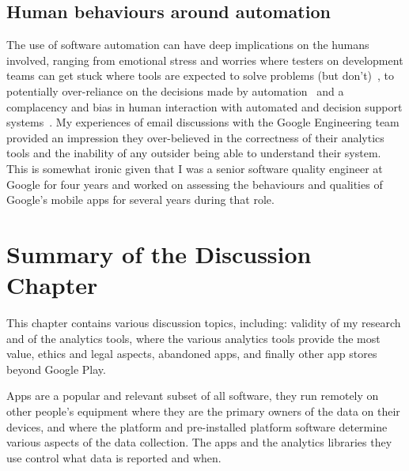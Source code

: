 \subsection{Human behaviours around automation}
The use of software automation can have deep implications on the humans involved, ranging from emotional stress and worries where testers on development teams can get stuck where tools are expected to solve problems (but don't)~\cite{evans2020stuck}, to potentially over-reliance on the decisions made by automation~\cite{cummings2004automation} and a complacency and bias in human interaction with automated and decision support systems~\cite{parasuraman_complacency_and_bias_in_human_use_of_automation}. 
My experiences of email discussions with the Google Engineering team provided an impression they over-believed in the correctness of their analytics tools and the inability of any outsider 
being able to understand their system. This is somewhat ironic given that I was a senior software quality engineer at Google for four years and worked on assessing the behaviours and qualities of Google's mobile apps for several years during that role.



\section{Summary of the Discussion Chapter}


This chapter contains various discussion topics, including: validity of my research and of the analytics tools, where the various analytics tools provide the most value, ethics and legal aspects, abandoned apps, and finally other app stores beyond Google Play.


Apps are a popular and relevant subset of all software, they run remotely on other people’s equipment where they are the primary owners of the data on their devices, and where the platform and pre-installed platform software determine various aspects of the data collection. The apps and the analytics libraries they use control what data is reported and when. 




